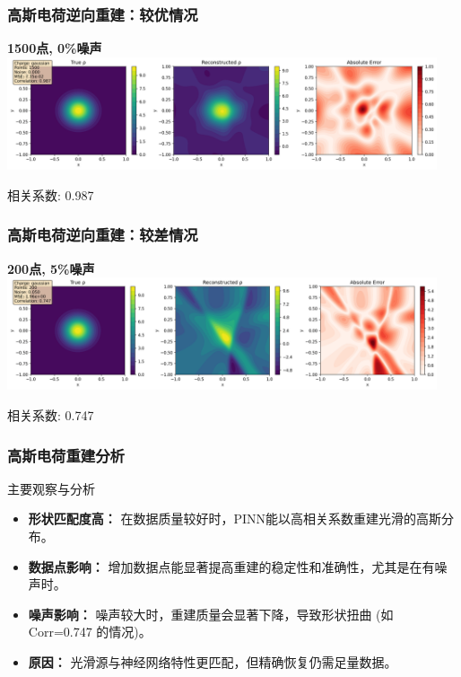 \documentclass[aspectratio=169]{ctexbeamer}
\begin{document}
\begin{frame}
	\frametitle{高斯电荷逆向重建：较优情况}
	\begin{center}
		\textbf{1500点, 0\%噪声}\\
		\includegraphics[width=0.95\textwidth]{figures/inverse_gaussian_1500pts_0noise_combined.png}

		\small 相关系数: 0.987
	\end{center}
\end{frame}

\begin{frame}
	\frametitle{高斯电荷逆向重建：较差情况}
	\begin{center}
		\textbf{200点, 5\%噪声}\\
		\includegraphics[width=0.95\textwidth]{figures/inverse_gaussian_200pts_5noise_combined.png}

		\small 相关系数: 0.747
	\end{center}
\end{frame}

\begin{frame}
	\frametitle{高斯电荷重建分析}
	\begin{alertblock}{主要观察与分析}
		\begin{itemize}
			\item \textbf{形状匹配度高：} 在数据质量较好时，PINN能以高相关系数重建光滑的高斯分布。
			\item \textbf{数据点影响：} 增加数据点能显著提高重建的稳定性和准确性，尤其是在有噪声时。
			\item \textbf{噪声影响：} 噪声较大时，重建质量会显著下降，导致形状扭曲 (如 Corr=0.747 的情况)。
			\item \textbf{原因：} 光滑源与神经网络特性更匹配，但精确恢复仍需足量数据。
		\end{itemize}
	\end{alertblock}
\end{frame}
\end{document}
